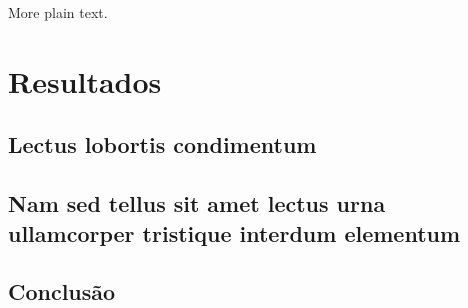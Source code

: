 \documentclass[12pt,oneside,a4paper]{abntex2}
\begin{document}
More plain text.

\lipsum[18-20]

\part{Resultados}

\chapter{Lectus lobortis condimentum}

\lipsum[21-23]

\chapter{Nam sed tellus sit amet lectus urna ullamcorper tristique interdum
elementum}

\lipsum[24]


\postextual


\chapter*{Conclusão}

\lipsum[31-33]





%
%

\end{document}
